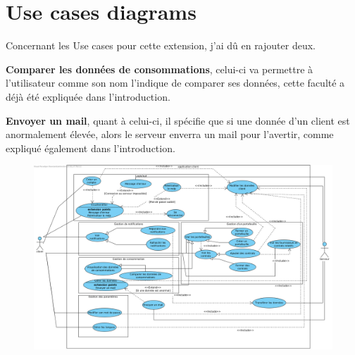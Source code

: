 \section{Use cases diagrams}

\begin{flushleft}
Concernant les Use cases pour cette extension, j'ai dû en rajouter deux.
\end{flushleft}

\begin{flushleft}
\textbf{Comparer les données de consommations}, celui-ci va permettre à l'utilisateur comme son nom l'indique de comparer ses données, cette faculté a déjà été expliquée dans l'introduction.
\end{flushleft}

\begin{flushleft}
\textbf{Envoyer un mail}, quant à celui-ci, il spécifie que si une donnée d'un client est anormalement élevée, alors le serveur enverra un mail pour l'avertir, comme expliqué également dans l'introduction.
\end{flushleft}

\begin{figure}[h]
\centering
\includegraphics[width=1.3\textwidth]{extension-adrien/Use-case/img/use-case.png}
\end{figure}
